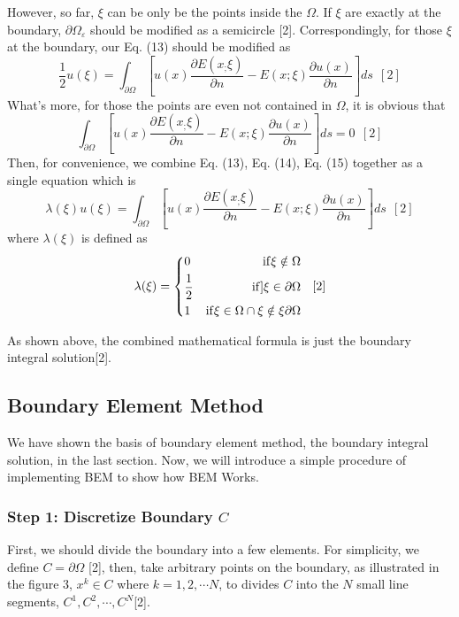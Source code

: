 \documentclass[a4paper,12pt]{article}
\begin{document}
\par However, so far, $\xi$ can be only be the points inside the $\Omega$.  If $\xi$ are exactly at the boundary, $\partial \Omega_{\varepsilon}$ should be modified as a semicircle [2]. Correspondingly, for those $\xi$ at the boundary, our Eq. (13) should be modified as 
\begin{equation}
\frac{1}{2}u(\xi) = \int_{\partial \Omega } [u(x)\frac{\partial E(x_;\xi)}{\partial n} - E(x;\xi) \frac{\partial u(x)}{\partial n}] ds \ \ [2]
\end{equation}
What's more, for those the points are even not contained in $\Omega$, it is obvious that 
\begin{equation}
\int_{\partial \Omega } [u(x)\frac{\partial E(x_;\xi)}{\partial n} - E(x;\xi) \frac{\partial u(x)}{\partial n}] ds = 0 \ \ [2]
\end{equation}
Then, for convenience, we combine Eq. (13), Eq. (14), Eq. (15) together as a single equation which is
\begin{equation}
\lambda(\xi)u(\xi) = \int_{\partial \Omega } [u(x)\frac{\partial E(x_;\xi)}{\partial n} - E(x;\xi) \frac{\partial u(x)}{\partial n}] ds  \ \ [2]
\end{equation}
where $\lambda (\xi)$ is defined as
\begin{equation}
\lambda(\xi) = \left\{
\begin{aligned}
&0 &{\rm if} \xi \notin \Omega\\
&\frac{1}{2} &{\rm if} ]\xi \in \partial\Omega\\
&1 &{\rm if} \xi \in \Omega \cap \xi \notin  \xi \partial\Omega\\
\end{aligned} 
\right. \ \ [2]
\end{equation}

As shown above, the combined mathematical formula is just the boundary integral solution[2].

\subsection{Boundary Element Method}
We have shown the basis of boundary element method, the boundary integral solution, in the last section. Now, we will introduce a simple procedure of implementing BEM to show how BEM Works.

\subsubsection*{Step 1: Discretize Boundary $C$ }
First, we should divide the boundary into a few elements. For simplicity, we define $C = \partial \Omega$ [2], then, take arbitrary points on the boundary, as illustrated in the figure 3, $x^{k} \in C$ where $k = 1,2, \cdots N$, to divides $C$ into the $N$ small line segments, $C^{1}, C^2, \cdots, C^{N}$[2].
\end{document}

